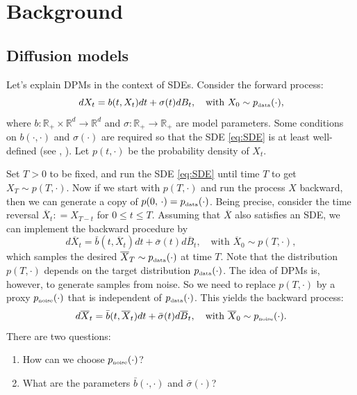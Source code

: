\documentclass[letterpaper,11pt,reqno]{amsart}
\numberwithin{equation}{section}
\begin{document}
\section{Background}
\label{sc2}

\subsection{Diffusion models}
\label{sc21}

Let's explain DPMs in the context of SDEs. 
Consider the forward process: 
\begin{equation}
\label{eq:SDE}
dX_t = b(t, X_t) dt + \sigma(t) dB_t, \quad \mbox{with } X_0 \sim p_{\tiny \mbox{data}}(\cdot),
\end{equation}
where
$b: \mathbb{R}_+ \times \mathbb{R}^d \to \mathbb{R}^d$ and 
 $\sigma: \mathbb{R}_+  \to \mathbb{R}_+$
are model parameters.
Some conditions on $b(\cdot, \cdot)$ and $\sigma(\cdot)$ are required
so that the SDE \eqref{eq:SDE} is at least well-defined (see \cite[Chapter 5]{KS91}, \cite[Section 3.1]{TZ23}).
Let $p(t, \cdot)$ be the probability density of $X_t$.

\quad Set $T > 0$ to be fixed, and run the SDE \eqref{eq:SDE} until time $T$ to get $X_T \sim p(T, \cdot)$.
Now if we start with $p(T, \cdot)$ and run the process $X$ backward,
then we can generate a copy of $p(0, \, \cdot) = p_{\tiny \mbox{data}}(\cdot)$.
Being precise, consider the time reversal $\overline{X}_t: = X_{T-t}$ for $0 \le t \le T$.
Assuming that $\overline{X}$ also satisfies an SDE, 
we can implement the backward procedure by
\begin{equation*}
d\overline{X}_t = \bar{b}(t, \overline{X}_t) dt + \bar{\sigma}(t) d\overline{B}_t, \quad \mbox{with } \overline{X}_0 \sim p(T, \cdot),
\end{equation*}
which samples the desired $\overline{X}_T  \sim p_{\tiny \mbox{data}}(\cdot)$ at time $T$.
Note that the distribution $p(T, \cdot)$ depends on the target distribution $p_{\tiny \mbox{data}}(\cdot)$.
The idea of DPMs is, however, to generate samples from noise.
So we need to replace $p(T, \cdot)$ by a proxy $p_{\tiny \mbox{noise}}(\cdot)$ that is independent of $p_{\tiny \mbox{data}}(\cdot)$.
This yields the backward process:
\begin{equation}
\label{eq:SDErev}
d\overline{X}_t = \bar{b}(t, \overline{X}_t) dt + \bar{\sigma}(t) d \overline{B}_t, \quad \mbox{with } \overline{X}_0 \sim p_{\tiny \mbox{noise}}(\cdot).
\end{equation}
There are two questions:
\begin{enumerate}[itemsep = 3 pt]
\item
How can we choose $p_{\tiny \mbox{noise}}(\cdot)$?
\item
What are the parameters $\bar{b}(\cdot, \cdot)$ and $\bar{\sigma}(\cdot)$?
\end{enumerate}
\end{document}

